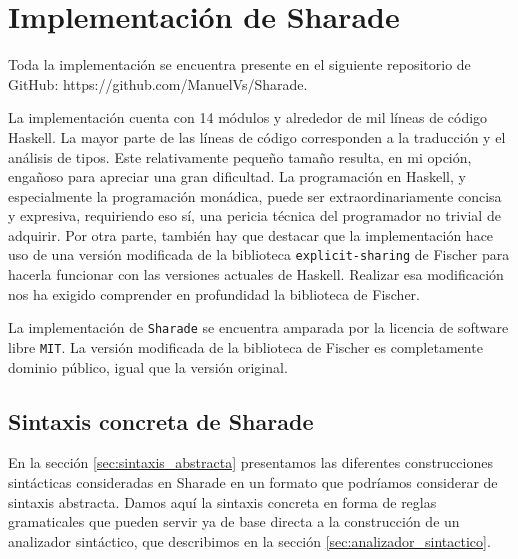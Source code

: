 \documentclass[class=article, crop=false]{standalone}
\begin{document}
\section{Implementación de Sharade}

Toda la implementación se encuentra presente en el siguiente repositorio de GitHub:
https://github.com/ManuelVs/Sharade.

La implementación cuenta con 14 módulos y alrededor de mil líneas de código Haskell. La mayor
parte de las líneas de código corresponden a la traducción y el análisis de tipos. Este
relativamente pequeño tamaño resulta, en mi opción, engañoso para apreciar una gran
dificultad. La programación en Haskell, y especialmente la programación monádica, puede ser
extraordinariamente concisa y expresiva, requiriendo eso sí, una pericia técnica del
programador no trivial de adquirir. Por otra parte, también hay que destacar que la
implementación hace uso de una versión modificada de la biblioteca \verb`explicit-sharing` de
Fischer para hacerla funcionar con las versiones actuales de Haskell. Realizar esa
modificación nos ha exigido comprender en profundidad la biblioteca de Fischer.

La implementación de \verb`Sharade` se encuentra amparada por la licencia de software libre
\verb`MIT`. La versión modificada de la biblioteca de Fischer es completamente dominio
público, igual que la versión original.

\subsection{Sintaxis concreta de Sharade}\label{sec:sintaxis_concreta}

En la sección \ref{sec:sintaxis_abstracta} presentamos las diferentes construcciones
sintácticas consideradas en Sharade en un formato que podríamos considerar de sintaxis
abstracta. Damos aquí la sintaxis concreta  en forma de reglas gramaticales que pueden servir
ya de base directa a la construcción de un analizador sintáctico, que describimos en la
sección \ref{sec:analizador_sintactico}.
\end{document}
